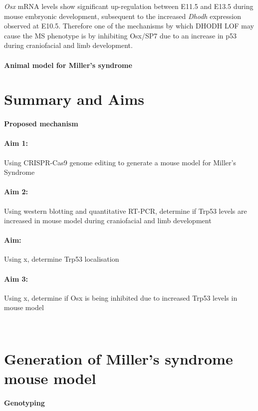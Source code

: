 \documentclass[12pt]{article}
\begin{document}
\textit{Osx} mRNA levels show significant up-regulation between E11.5 and E13.5 during mouse embryonic development, subsequent to the increased \textit{Dhodh} expression observed at E10.5. Therefore one of the mechanisms by which DHODH LOF may cause the MS phenotype is by inhibiting  Osx/SP7  due to an increase in p53  during craniofacial and limb development.


\paragraph{Animal model for Miller's syndrome}


\section{Summary and Aims}

\paragraph{Proposed mechanism}


\paragraph{Aim 1:} Using CRISPR-Cas9 genome editing to generate a mouse model for Miller's Syndrome
\paragraph{Aim 2:} Using western blotting and quantitative RT-PCR, determine if Trp53 levels are increased in mouse model during craniofacial and limb development 
\paragraph{Aim:} Using x, determine Trp53 localisation 
\paragraph{Aim 3:} Using x, determine if Osx is being inhibited due to increased Trp53 levels in mouse model 

\

\section{Generation of Miller's syndrome mouse model}

\paragraph{Genotyping}
\end{document}
